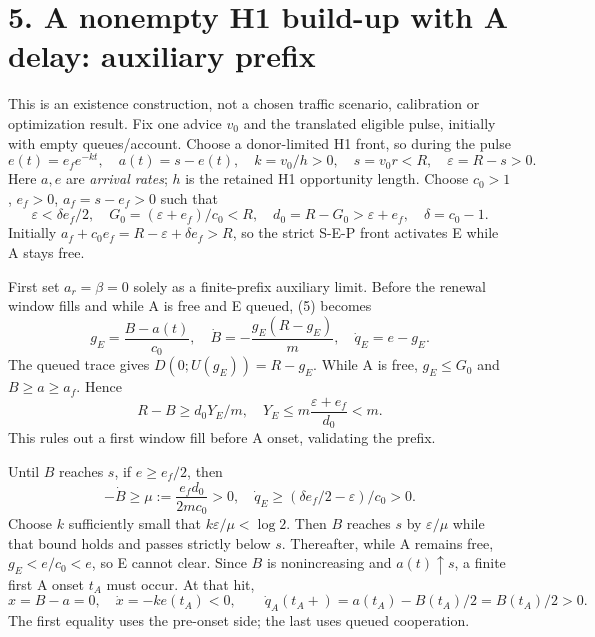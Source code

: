 \documentclass[11pt,a4paper]{article}
\begin{document}
\newpage
\section*{5. A nonempty H1 build-up with A delay: auxiliary prefix}

This is an existence construction, not a chosen traffic scenario, calibration
or optimization result. Fix one advice $v_0$ and the translated eligible
pulse, initially with empty queues/account. Choose a donor-limited H1 front,
so during the pulse
\begin{equation}
 e(t)=e_f e^{-kt},\quad a(t)=s-e(t),\quad k=v_0/h>0,\quad
 s=v_0r<R,\quad \varepsilon=R-s>0. \tag{15}
\end{equation}
Here $a,e$ are \emph{arrival rates}; $h$ is the retained H1 opportunity
length. Choose $c_0>1$, $e_f>0$, $a_f=s-e_f>0$ such that
\begin{equation}
 \varepsilon<\delta e_f/2,\quad
 G_0=(\varepsilon+e_f)/c_0<R,\quad
 d_0=R-G_0>\varepsilon+e_f,\quad \delta=c_0-1. \tag{16}
\end{equation}
Initially $a_f+c_0e_f=R-\varepsilon+\delta e_f>R$, so the strict
S-E-P front activates E while A stays free.

First set $a_r=\beta=0$ solely as a finite-prefix auxiliary limit. Before
the renewal window fills and while A is free and E queued, (5) becomes
\begin{equation}
 g_E=\frac{B-a(t)}{c_0},\quad
 \dot B=-\frac{g_E(R-g_E)}m,\quad
 \dot q_E=e-g_E. \tag{17}
\end{equation}
The queued trace gives $D(0;U(g_E))=R-g_E$. While A is free,
$g_E\leq G_0$ and $B\geq a\geq a_f$. Hence
\begin{equation}
 R-B\geq d_0Y_E/m,\quad
 Y_E\leq m\frac{\varepsilon+e_f}{d_0}<m. \tag{18}
\end{equation}
This rules out a first window fill before A onset, validating the prefix.

Until $B$ reaches $s$, if $e\geq e_f/2$, then
\begin{equation}
 -\dot B\geq\mu:=\frac{e_fd_0}{2mc_0}>0,\quad
 \dot q_E\geq(\delta e_f/2-\varepsilon)/c_0>0. \tag{19}
\end{equation}
Choose $k$ sufficiently small that $k\varepsilon/\mu<\log2$.
Then $B$ reaches $s$ by $\varepsilon/\mu$ while that bound holds and
passes strictly below $s$. Thereafter, while A remains free,
$g_E<e/c_0<e$, so E cannot clear. Since $B$ is nonincreasing and
$a(t)\uparrow s$, a finite first A onset $t_A$ must occur. At that hit,
\begin{equation}
 x=B-a=0,\quad \dot x=-ke(t_A)<0,\qquad
 \dot q_A(t_A+) =a(t_A)-B(t_A)/2=B(t_A)/2>0. \tag{20}
\end{equation}
The first equality uses the pre-onset side; the last uses queued cooperation.
\end{document}
